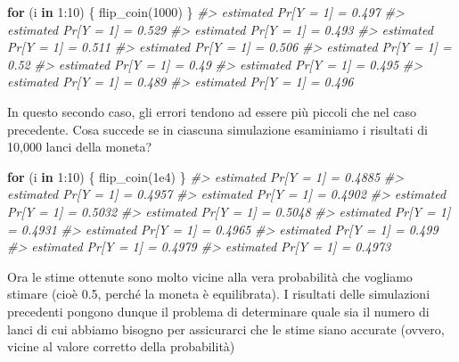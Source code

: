 \documentclass[
  11pt,
]{krantz}
\makeatletter
\newenvironment{Shaded}{\begin{snugshade}}{\end{snugshade}}
\newcommand{\CommentTok}[1]{\textcolor[rgb]{0.37,0.37,0.37}{\textit{#1}}}
\newcommand{\ControlFlowTok}[1]{\textcolor[rgb]{0.27,0.27,0.27}{\textbf{#1}}}
\newcommand{\DecValTok}[1]{\textcolor[rgb]{0.06,0.06,0.06}{#1}}
\newcommand{\FloatTok}[1]{\textcolor[rgb]{0.06,0.06,0.06}{#1}}
\newcommand{\FunctionTok}[1]{\textcolor[rgb]{0,0,0}{#1}}
\newcommand{\NormalTok}[1]{#1}
\newcommand{\SpecialCharTok}[1]{\textcolor[rgb]{0,0,0}{#1}}
\newenvironment{kframe}{%
\medskip{}
\setlength{\fboxsep}{.8em}
 \def\at@end@of@kframe{}%
 \ifinner\ifhmode%
  \def\at@end@of@kframe{\end{minipage}}%
  \begin{minipage}{\columnwidth}%
 \fi\fi%
 \def\FrameCommand##1{\hskip\@totalleftmargin \hskip-\fboxsep
 \colorbox{shadecolor}{##1}\hskip-\fboxsep
     \hskip-\linewidth \hskip-\@totalleftmargin \hskip\columnwidth}%
 \MakeFramed {\advance\hsize-\width
   \@totalleftmargin\z@ \linewidth\hsize
   \@setminipage}}%
 {\par\unskip\endMakeFramed%
 \at@end@of@kframe}
\renewenvironment{Shaded}{\begin{kframe}}{\end{kframe}}
\theoremstyle{definition}
\theoremstyle{definition}
\theoremstyle{definition}
\theoremstyle{definition}
\theoremstyle{remark}
\makeatother
\begin{document}
\begin{Shaded}
\begin{Highlighting}[]
\ControlFlowTok{for}\NormalTok{ (i }\ControlFlowTok{in} \DecValTok{1}\SpecialCharTok{:}\DecValTok{10}\NormalTok{) \{}
  \FunctionTok{flip\_coin}\NormalTok{(}\DecValTok{1000}\NormalTok{)}
\NormalTok{\}}
\CommentTok{\#\textgreater{} estimated Pr[Y = 1] = 0.497 }
\CommentTok{\#\textgreater{} estimated Pr[Y = 1] = 0.529 }
\CommentTok{\#\textgreater{} estimated Pr[Y = 1] = 0.493 }
\CommentTok{\#\textgreater{} estimated Pr[Y = 1] = 0.511 }
\CommentTok{\#\textgreater{} estimated Pr[Y = 1] = 0.506 }
\CommentTok{\#\textgreater{} estimated Pr[Y = 1] = 0.52 }
\CommentTok{\#\textgreater{} estimated Pr[Y = 1] = 0.49 }
\CommentTok{\#\textgreater{} estimated Pr[Y = 1] = 0.495 }
\CommentTok{\#\textgreater{} estimated Pr[Y = 1] = 0.489 }
\CommentTok{\#\textgreater{} estimated Pr[Y = 1] = 0.496}
\end{Highlighting}
\end{Shaded}

In questo secondo caso, gli errori tendono ad essere più piccoli che nel caso precedente. Cosa succede se in ciascuna simulazione esaminiamo i risultati di 10,000 lanci della moneta?

\begin{Shaded}
\begin{Highlighting}[]
\ControlFlowTok{for}\NormalTok{ (i }\ControlFlowTok{in} \DecValTok{1}\SpecialCharTok{:}\DecValTok{10}\NormalTok{) \{}
  \FunctionTok{flip\_coin}\NormalTok{(}\FloatTok{1e4}\NormalTok{)}
\NormalTok{\}}
\CommentTok{\#\textgreater{} estimated Pr[Y = 1] = 0.4885 }
\CommentTok{\#\textgreater{} estimated Pr[Y = 1] = 0.4957 }
\CommentTok{\#\textgreater{} estimated Pr[Y = 1] = 0.4902 }
\CommentTok{\#\textgreater{} estimated Pr[Y = 1] = 0.5032 }
\CommentTok{\#\textgreater{} estimated Pr[Y = 1] = 0.5048 }
\CommentTok{\#\textgreater{} estimated Pr[Y = 1] = 0.4931 }
\CommentTok{\#\textgreater{} estimated Pr[Y = 1] = 0.4965 }
\CommentTok{\#\textgreater{} estimated Pr[Y = 1] = 0.499 }
\CommentTok{\#\textgreater{} estimated Pr[Y = 1] = 0.4979 }
\CommentTok{\#\textgreater{} estimated Pr[Y = 1] = 0.4973}
\end{Highlighting}
\end{Shaded}

Ora le stime ottenute sono molto vicine alla vera probabilità che vogliamo stimare (cioè 0.5, perché la moneta è equilibrata). I risultati delle simulazioni precedenti pongono dunque il problema di determinare quale sia il numero di lanci di cui abbiamo bisogno per assicurarci che le stime siano accurate (ovvero, vicine al valore corretto della probabilità)
\end{document}

